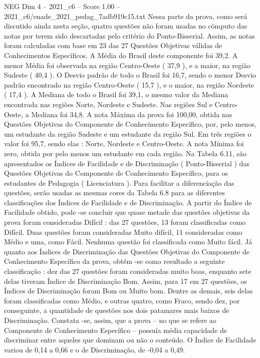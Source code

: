 \begin{textsample}{NEG Dim 4 – 2021\_c6 – Score 1.00 – 2021\_c6/enade\_2021\_pedag\_7adb919c15.txt}
Nessa parte da prova, como será discutido ainda nesta seção, quatro questões não foram usadas no cômputo das notas por terem sido descartadas pelo critério do Ponto-Bisserial.
Assim, as notas foram calculadas com base em 23 das 27 Questões Objetivas válidas de Conhecimentos Específicos.
A Média do Brasil deste componente foi 39,2.
A menor Média foi observada na região Centro-Oeste ( 37,9 ), e a maior, na região Sudeste ( 40,4 ).
O Desvio padrão de todo o Brasil foi 16,7, sendo o menor Desvio padrão encontrado na região Centro-Oeste ( 15,7 ), e o maior, na região Nordeste ( 17,4 ).
A Mediana de todo o Brasil foi 39,1, o mesmo valor da Mediana encontrada nas regiões Norte, Nordeste e Sudeste.
Nas regiões Sul e Centro-Oeste, a Mediana foi 34,8.
A nota Máxima da prova foi 100,00, obtida nas Questões Objetivas do Componente de Conhecimento Específico, por, pelo menos, um estudante da região Sudeste e um estudante da região Sul.
Em três regiões o valor foi 95,7, sendo elas : Norte, Nordeste e Centro-Oeste.
A nota Mínima foi zero, obtida por pelo menos um estudante em cada região.
Na Tabela 6.11, são apresentados os Índices de Facilidade e de Discriminação ( Ponto-Bisserial ) das Questões Objetivas do Componente de Conhecimento Específico, para os estudantes de Pedagogia ( Licenciatura ).
Para facilitar a diferenciação das questões, serão usadas as mesmas cores da Tabela 6.8 para as diferentes classificações dos Índices de Facilidade e de Discriminação.
A partir do Índice de Facilidade obtido, pode -se concluir que quase metade das questões objetivas da prova foram consideradas Difícil : das 27 questões, 13 foram classificadas como Difícil.
Duas questões foram consideradas Muito difícil, 11 consideradas como Médio e uma, como Fácil.
Nenhuma questão foi classificada como Muito fácil.
Já quanto aos Índices de Discriminação das Questões Objetivas do Componente de Conhecimento Específico da prova, obtém -se como resultado a seguinte classificação : dez das 27 questões foram consideradas muito boas, enquanto sete delas tiveram Índice de Discriminação Bom.
Assim, para 17 em 27 questões, os Índices de Discriminação foram Bom ou Muito bom.
Dentre as demais, seis delas foram classificadas como Médio, e outras quatro, como Fraco, sendo dez, por conseguinte, a quantidade de questões nos dois patamares mais baixos de Discriminação.
Constata -se, assim, que a prova – no que se refere ao Componente de Conhecimento Específico – possuía média capacidade de discriminar entre aqueles que dominam ou não o conteúdo.
O Índice de Facilidade variou de 0,14 a 0,66 e o de Discriminação, de -0,04 a 0,49.

\end{textsample}
